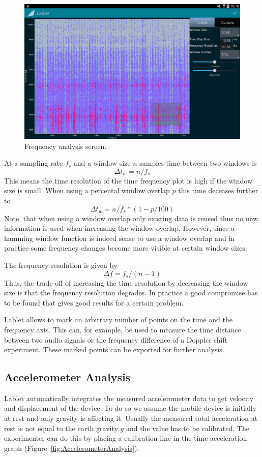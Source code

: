\documentclass{sigchi}
\begin{document}
\begin{figure}
  \centering
  \includegraphics[width=.99\columnwidth]{FrequencyAnalysis}
  \caption{Frequency analysis screen.\label{fig:FrequencyAnalysis}}
\end{figure}

At a sampling rate $f_s$ and a window size $n$ samples time between
two windows is
\[
\Delta t_w = n / f_s
\]
This means the time resolution of the time frequency plot is high if
the window size is small.  When using a percental window overlap $p$
this time deceases further to
\[
\Delta t_w = n / f_s * (1 - p / 100)
\]
Note, that when using a window overlap only existing data is reused
thus no new information is used when increasing the window overlap.
However, since a hamming window function is indeed sense to use a
window overlap and in practice some frequency changes become more
visible at certain window sizes.

The frequency resolution is given by
\[
\Delta f = f_s / (n - 1)
\]
Thus, the trade-off of increasing the time resolution by decreasing
the window size is that the frequency resolution degrades.  In
practice a good compromise has to be found that gives good results for
a certain problem.

Lablet allows to mark an arbitrary number of points on the time and
the frequency axis.  This can, for example, be used to measure the
time distance between two audio signals or the frequency difference of
a Doppler shift experiment.  These marked points can be exported for
further analysis.

\subsection{Accelerometer Analysis}
Lablet automatically integrates the measured accelerometer data to get
velocity and displacement of the device.  To do so we assume the
mobile device is initially at rest and only gravity is affecting it.
Usually the measured total acceleration at rest is not equal to the
earth gravity $g$ and the value has to be calibrated.  The
experimenter can do this by placing a calibration line in the time
acceleration graph (Figure~\ref{fig:AccelerometerAnalysis}).
\end{document}
